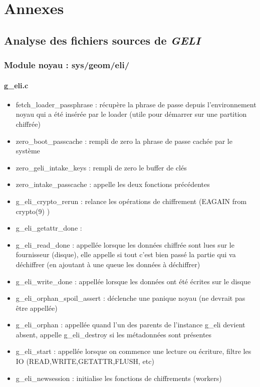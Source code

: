 \section{Annexes}

\subsection{Analyse des fichiers sources de \em GELI}
\subsubsection{Module noyau : sys/geom/eli/}
\paragraph{g\_eli.c}
\begin{itemize}
	\item fetch\_loader\_passphrase : récupère la phrase de passe depuis 
		l'environnement noyau qui a été insérée par le loader 
		(utile pour démarrer sur une partition chiffrée)
	\item zero\_boot\_passcache : rempli de zero la phrase de passe cachée par le 
		système
	\item zero\_geli\_intake\_keys : rempli de zero le buffer de clés
	\item zero\_intake\_passcache : appelle les deux fonctions précédentes
	\item g\_eli\_crypto\_rerun : relance les opérations de chiffrement (EAGAIN from
		crypto(9) )
	\item g\_eli\_getattr\_done : 
	\item g\_eli\_read\_done : appellée lorsque les données chiffrée sont lues sur le 
		fournisseur (disque), elle appelle si tout c'est bien passé la partie
		qui va déchiffrer (en ajoutant à une queue les données à déchiffrer)
	\item g\_eli\_write\_done : appellée lorsque les données ont été écrites sur le 
		disque
	\item g\_eli\_orphan\_spoil\_assert : déclenche une panique noyau (ne devrait pas
		être appellée)
	\item g\_eli\_orphan : appellée quand l'un des parents de l'instance g\_eli 
		devient absent, appelle g\_eli\_destroy si les métadonnées sont présentes
	\item g\_eli\_start : appellée lorsque on commence une lecture ou écriture, 
		filtre les IO (READ,WRITE,GETATTR,FLUSH, etc)
	\item g\_eli\_newsession : initialise les fonctions de chiffrements (workers)

\end{itemize}
